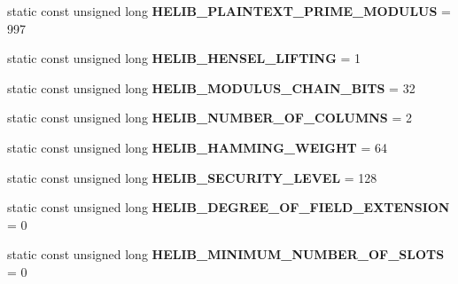 \begin{DoxyCompactItemize}
\item 
\mbox{\label{classhomomorphine_1_1_constants_a25426ff47774d7ff0b88a0f7af1cfbb5}} 
static const unsigned long {\bfseries H\+E\+L\+I\+B\+\_\+\+P\+L\+A\+I\+N\+T\+E\+X\+T\+\_\+\+P\+R\+I\+M\+E\+\_\+\+M\+O\+D\+U\+L\+US} = 997
\item 
\mbox{\label{classhomomorphine_1_1_constants_a1392b13d6e1546225b95928311e53e85}} 
static const unsigned long {\bfseries H\+E\+L\+I\+B\+\_\+\+H\+E\+N\+S\+E\+L\+\_\+\+L\+I\+F\+T\+I\+NG} = 1
\item 
\mbox{\label{classhomomorphine_1_1_constants_a0dff16e6343989a60f4833605e45525f}} 
static const unsigned long {\bfseries H\+E\+L\+I\+B\+\_\+\+M\+O\+D\+U\+L\+U\+S\+\_\+\+C\+H\+A\+I\+N\+\_\+\+B\+I\+TS} = 32
\item 
\mbox{\label{classhomomorphine_1_1_constants_af08d97d4333bf772d742dddb6cac3af7}} 
static const unsigned long {\bfseries H\+E\+L\+I\+B\+\_\+\+N\+U\+M\+B\+E\+R\+\_\+\+O\+F\+\_\+\+C\+O\+L\+U\+M\+NS} = 2
\item 
\mbox{\label{classhomomorphine_1_1_constants_a86e3b8595c5ea2ed0be83f454dcc22d9}} 
static const unsigned long {\bfseries H\+E\+L\+I\+B\+\_\+\+H\+A\+M\+M\+I\+N\+G\+\_\+\+W\+E\+I\+G\+HT} = 64
\item 
\mbox{\label{classhomomorphine_1_1_constants_a043276f012d91267f62249aee29dfc04}} 
static const unsigned long {\bfseries H\+E\+L\+I\+B\+\_\+\+S\+E\+C\+U\+R\+I\+T\+Y\+\_\+\+L\+E\+V\+EL} = 128
\item 
\mbox{\label{classhomomorphine_1_1_constants_aac8aee7a978989ff544b02f8534fff24}} 
static const unsigned long {\bfseries H\+E\+L\+I\+B\+\_\+\+D\+E\+G\+R\+E\+E\+\_\+\+O\+F\+\_\+\+F\+I\+E\+L\+D\+\_\+\+E\+X\+T\+E\+N\+S\+I\+ON} = 0
\item 
\mbox{\label{classhomomorphine_1_1_constants_a94ae2d93d643d610ef822f8a06dde37f}} 
static const unsigned long {\bfseries H\+E\+L\+I\+B\+\_\+\+M\+I\+N\+I\+M\+U\+M\+\_\+\+N\+U\+M\+B\+E\+R\+\_\+\+O\+F\+\_\+\+S\+L\+O\+TS} = 0

\end{DoxyCompactItemize}
